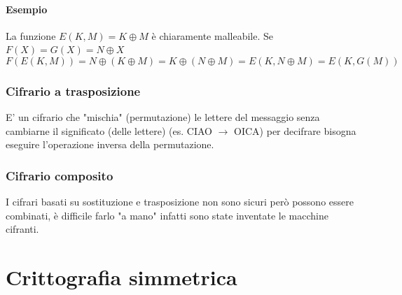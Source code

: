 \documentclass[12pt, a4paper]{report}
\begin{document}
\subsubsection{Esempio}
La funzione $E(K,M)=K\oplus M$ è chiaramente malleabile. Se $F(X)=G(X)=N\oplus X$
\begin{equation*}
    F(E(K,M)) = N\oplus (K\oplus M) = K \oplus (N\oplus M) = E(K,N\oplus M) = E(K,G(M))
\end{equation*}
\subsection{Cifrario a trasposizione}
E' un cifrario che "mischia" (permutazione) le lettere del messaggio senza cambiarne il significato (delle lettere) (es. CIAO $\rightarrow$ OICA) per decifrare bisogna eseguire l'operazione inversa della permutazione.
\subsection{Cifrario composito}
I cifrari basati su sostituzione e trasposizione non sono sicuri però possono essere combinati, è difficile farlo "a mano" infatti sono state inventate le macchine cifranti.
\chapter{Crittografia simmetrica}
\end{document}

